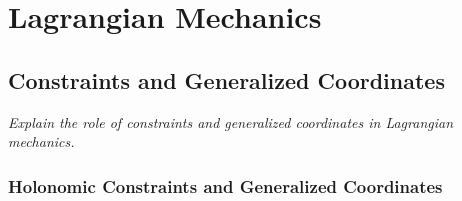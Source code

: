 \documentclass[11pt, a4paper]{article}
\begin{document}
\newpage
\section{Lagrangian Mechanics}

\subsection{Constraints and Generalized Coordinates}
\textit{Explain the role of constraints and generalized coordinates in Lagrangian mechanics.}

\subsubsection{Holonomic Constraints and Generalized Coordinates} \label{sssec:lag:hol_const}
\end{document}
